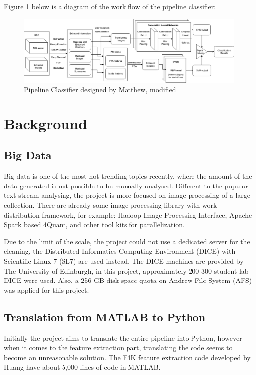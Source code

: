\documentclass[bsc,logo,twoside,fullspacing,parskip]{infthesis}
\begin{document}
Figure \ref{fig:pipeline} below is a diagram of the work flow of the pipeline classifier:


\begin{figure}[!b]
    \centering
    \includegraphics[scale=0.34]{graph/Pipeline_Classifier.png}
    \caption{Pipeline Classifier designed by Matthew, modified}
    \label{fig:pipeline}
\end{figure}

\chapter{Background}


\section{Big Data}

Big data is one of the most hot trending topics recently, where the amount of the data generated is not possible to be manually analysed. 
Different to the popular text stream analysing, the project is more focused on image processing of a large collection. 
There are already some image processing library with work distribution framework, for example: Hadoop Image Processing Interface\cite{L3}, Apache Spark based 4Quant\cite{L4}, and other tool kits for parallelization.

Due to the limit of the scale, the project could not use a dedicated server for the cleaning, the Distributed Informatics Computing Environment (DICE) with Scientific Linux 7 (SL7) are used instead. 
The DICE machines are provided by The University of Edinburgh, in this project, approximately 200-300 student lab DICE were used.
Also, a 256 GB disk space quota on Andrew File System (AFS) was applied for this project.

\section{Translation from MATLAB to Python}
\label{sec:translate}

Initially the project aims to translate the entire pipeline into Python, however when it comes to the feature extraction part, translating the code seems to become an unreasonable solution.
The F4K feature extraction code developed by Huang have about 5,000 lines of code in MATLAB.
\end{document}
